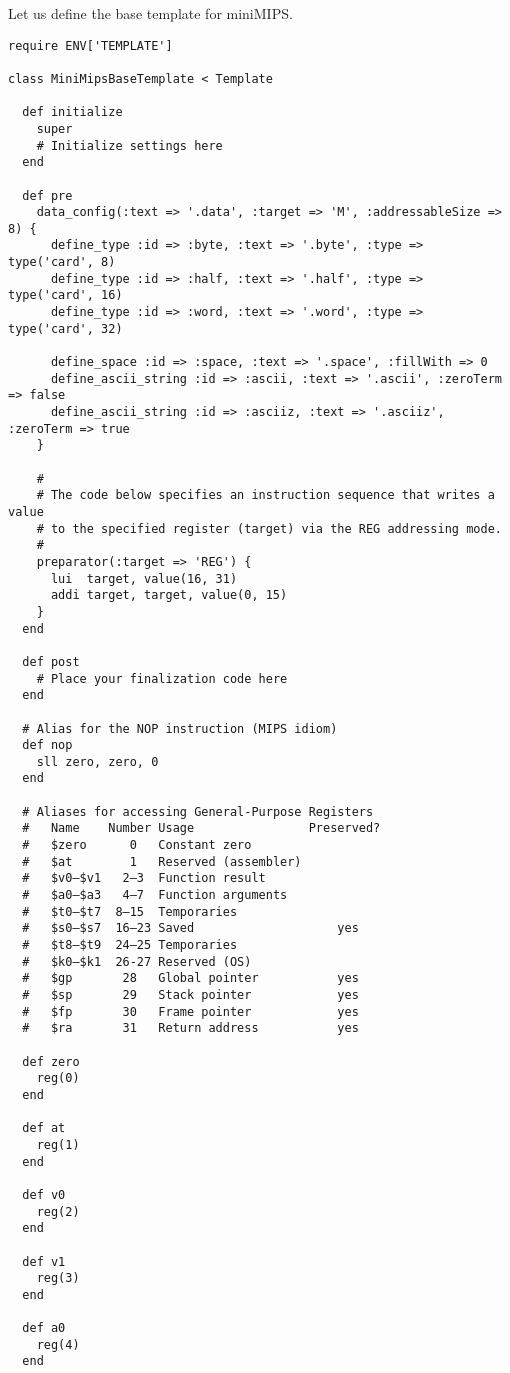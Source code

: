 \documentclass[oneside,final,12pt]{extreport}
\begin{document}
\bigskip

Let us define the base template for miniMIPS.


\begin{verbatim}
require ENV['TEMPLATE']

class MiniMipsBaseTemplate < Template

  def initialize
    super
    # Initialize settings here 
  end

  def pre
    data_config(:text => '.data', :target => 'M', :addressableSize => 8) {
      define_type :id => :byte, :text => '.byte', :type => type('card', 8)
      define_type :id => :half, :text => '.half', :type => type('card', 16)
      define_type :id => :word, :text => '.word', :type => type('card', 32)

      define_space :id => :space, :text => '.space', :fillWith => 0
      define_ascii_string :id => :ascii, :text => '.ascii', :zeroTerm => false
      define_ascii_string :id => :asciiz, :text => '.asciiz', :zeroTerm => true
    }

    #
    # The code below specifies an instruction sequence that writes a value
    # to the specified register (target) via the REG addressing mode.
    #
    preparator(:target => 'REG') {
      lui  target, value(16, 31)
      addi target, target, value(0, 15)
    }
  end

  def post
    # Place your finalization code here
  end

  # Alias for the NOP instruction (MIPS idiom)
  def nop
    sll zero, zero, 0
  end

  # Aliases for accessing General-Purpose Registers
  #   Name    Number Usage                Preserved?
  #   $zero      0   Constant zero
  #   $at        1   Reserved (assembler)
  #   $v0–$v1   2–3  Function result
  #   $a0–$a3   4–7  Function arguments
  #   $t0–$t7  8–15  Temporaries
  #   $s0–$s7  16–23 Saved                    yes
  #   $t8–$t9  24–25 Temporaries
  #   $k0–$k1  26-27 Reserved (OS)
  #   $gp       28   Global pointer           yes
  #   $sp       29   Stack pointer            yes
  #   $fp       30   Frame pointer            yes
  #   $ra       31   Return address           yes

  def zero
    reg(0)
  end

  def at
    reg(1)
  end

  def v0
    reg(2)
  end

  def v1
    reg(3)
  end

  def a0
    reg(4)
  end


\end{verbatim}
\end{document}
